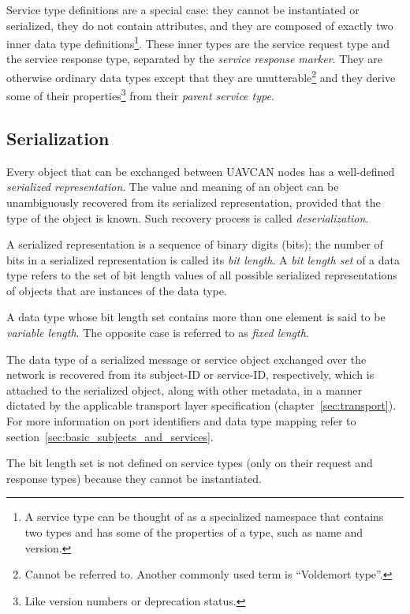 Service type definitions are a special case:
they cannot be instantiated or serialized, they do not contain attributes,
and they are composed of exactly two inner data type definitions\footnote{
    A service type can be thought of as a specialized namespace that contains two types and
    has some of the properties of a type, such as name and version.
}.
These inner types are the service request type and the service response type,
separated by the \emph{service response marker}.
They are otherwise ordinary data types except that they are unutterable\footnote{%
    Cannot be referred to. Another commonly used term is ``Voldemort type''.
}
and they derive some of their properties\footnote{Like version numbers or deprecation status.}
from their \emph{parent service type}.

\subsection{Serialization}

Every object that can be exchanged between UAVCAN nodes has a well-defined \emph{serialized representation}.
The value and meaning of an object can be unambiguously recovered from its serialized representation,
provided that the type of the object is known.
Such recovery process is called \emph{deserialization}.

\label{sec:dsdl_bit_length_set}
A serialized representation is a sequence of binary digits (bits);
the number of bits in a serialized representation is called its \emph{bit length}.
A \emph{bit length set} of a data type refers to the set of bit length values of all possible
serialized representations of objects that are instances of the data type.

A data type whose bit length set contains more than one element is said to be \emph{variable length}.
The opposite case is referred to as \emph{fixed length}.

The data type of a serialized message or service object exchanged over the network
is recovered from its subject-ID or service-ID, respectively,
which is attached to the serialized object, along with other metadata, in a manner dictated by the applicable
transport layer specification (chapter~\ref{sec:transport}).
For more information on port identifiers and data type mapping refer to section~\ref{sec:basic_subjects_and_services}.

The bit length set is not defined on service types (only on their request and response types)
because they cannot be instantiated.
